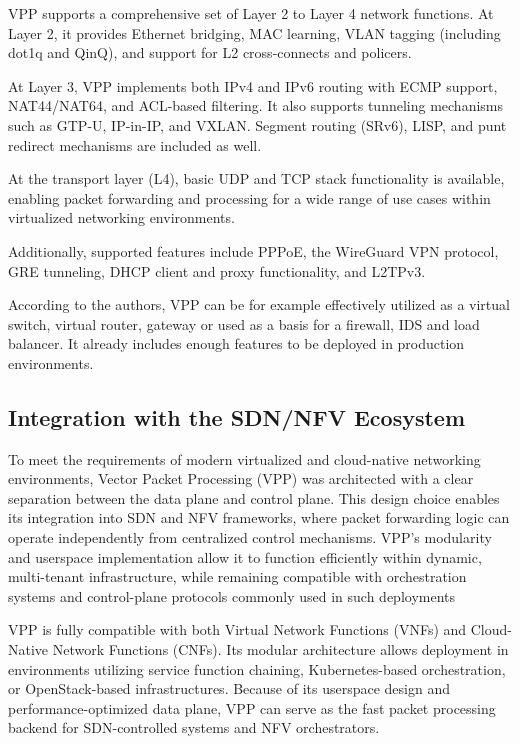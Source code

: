VPP supports a comprehensive set of Layer 2 to Layer 4 network functions. 
At Layer 2, it provides Ethernet bridging, MAC learning, VLAN tagging (including dot1q and QinQ), and support for L2 cross-connects and policers.

At Layer 3, VPP implements both IPv4 and IPv6 routing with ECMP support, NAT44/NAT64, and ACL-based filtering. 
It also supports tunneling mechanisms such as GTP-U, IP-in-IP, and VXLAN. Segment routing (SRv6), LISP, and punt redirect mechanisms are included as well.

At the transport layer (L4), basic UDP and TCP stack functionality is available, 
enabling packet forwarding and processing for a wide range of use cases within virtualized networking environments.

Additionally, supported features include PPPoE, the WireGuard VPN protocol, GRE tunneling, DHCP client and proxy functionality, and L2TPv3.\cite{fdio-vpp-features-2502}

According to the authors, VPP can be for example effectively utilized as a virtual switch, virtual router, gateway or used as a basis for a firewall, IDS and load balancer.\cite{fdio_what_is_vpp}
It already includes enough features to be deployed in production environments.



\subsection{Integration with the SDN/NFV Ecosystem}
To meet the requirements of modern virtualized and cloud-native networking environments, Vector Packet Processing (VPP) was architected with a clear separation between the data plane and control plane. 
This design choice enables its integration into SDN and NFV frameworks, where packet forwarding logic can operate independently from centralized control mechanisms. 
VPP's modularity and userspace implementation allow it to function efficiently within dynamic, multi-tenant infrastructure, 
while remaining compatible with orchestration systems and control-plane protocols commonly used in such deployments

VPP is fully compatible with both Virtual Network Functions (VNFs) and Cloud-Native Network Functions (CNFs). 
Its modular architecture allows deployment in environments utilizing service function chaining, Kubernetes-based orchestration, or OpenStack-based infrastructures. 
Because of its userspace design and performance-optimized data plane, VPP can serve as the fast packet processing backend for SDN-controlled systems and NFV orchestrators.\cite{fdio2017whitepaper}

